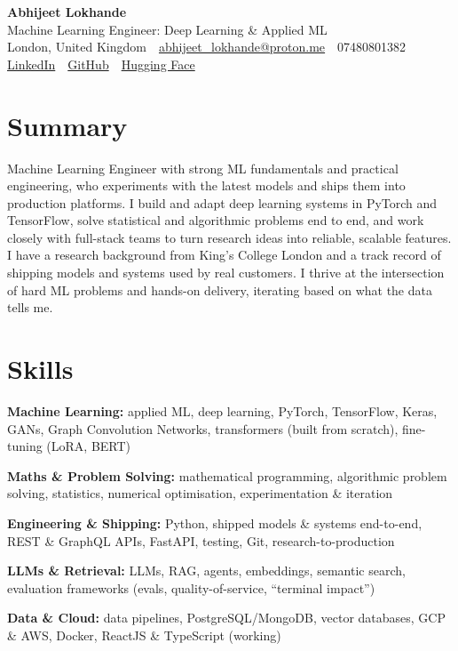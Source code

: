 \documentclass[10pt,a4paper]{article}
\newcommand{\sep}{\,\textcolor{accent!60}{\textbar}\,}
\begin{document}
\begin{center}
  {\fontsize{24}{26}\selectfont\bfseries Abhijeet Lokhande}\\[3pt]
  {\color{accent}\large Machine Learning Engineer: Deep Learning \& Applied ML}\\[5pt]
  {\small
    London, United Kingdom \sep
    \href{mailto:abhijeet_lokhande@proton.me}{abhijeet\_lokhande@proton.me} \sep
    07480801382 \\[2pt]
    \href{https://www.linkedin.com/in/ablds/}{LinkedIn} \sep
    \href{https://github.com/abhijeetscode}{GitHub} \sep
    \href{https://huggingface.co/ab-ai}{Hugging Face}
  }
\end{center}
\vspace{2pt}

\section{Summary}
Machine Learning Engineer with strong ML fundamentals and practical engineering, who experiments with the latest models and ships them into production platforms. I build and adapt deep learning systems in PyTorch and TensorFlow, solve statistical and algorithmic problems end to end, and work closely with full-stack teams to turn research ideas into reliable, scalable features. I have a research background from King's College London and a track record of shipping models and systems used by real customers. I thrive at the intersection of hard ML problems and hands-on delivery, iterating based on what the data tells me.

\section{Skills}
\begin{tight}
  \item[\textcolor{accent}{\small$\bullet$}] \textbf{Machine Learning:} applied ML, deep learning, PyTorch, TensorFlow, Keras, GANs, Graph Convolution Networks, transformers (built from scratch), fine-tuning (LoRA, BERT)
  \item[\textcolor{accent}{\small$\bullet$}] \textbf{Maths \& Problem Solving:} mathematical programming, algorithmic problem solving, statistics, numerical optimisation, experimentation \& iteration
  \item[\textcolor{accent}{\small$\bullet$}] \textbf{Engineering \& Shipping:} Python, shipped models \& systems end-to-end, REST \& GraphQL APIs, FastAPI, testing, Git, research-to-production
  \item[\textcolor{accent}{\small$\bullet$}] \textbf{LLMs \& Retrieval:} LLMs, RAG, agents, embeddings, semantic search, evaluation frameworks (evals, quality-of-service, ``terminal impact'')
  \item[\textcolor{accent}{\small$\bullet$}] \textbf{Data \& Cloud:} data pipelines, PostgreSQL/MongoDB, vector databases, GCP \& AWS, Docker, ReactJS \& TypeScript (working)
\end{tight}
\end{document}
